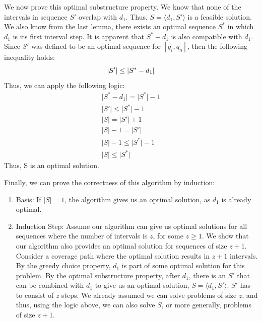 \documentclass[conference]{IEEEtran}
\theoremstyle{plain}%
\begin{document}
We now prove this optimal substructure property. We know that none of the intervals in sequence $S'$ overlap with $d_1$. Thus, $S = \langle d_1, S' \rangle$ is a feasible solution. We also know from the last lemma, there exists an optimal sequence $S^*$ in which $d_1$ is its first interval step. It is apparent that $S^* - d_1$ is also compatible with $d_1$. Since $S'$ was defined to be an optimal sequence for $[q_i, q_n]$, then the following inequality holds:
\begin{equation*}
\lvert S' \rvert \leq \lvert S^* - d_1 \rvert \\
\end{equation*}
Thus, we can apply the following logic:
\begin{gather*}
\lvert S^* - d_1 \rvert = \lvert S^* \rvert -1 \\
\lvert S' \rvert \leq \lvert S^* \rvert -1 \\
\lvert S \rvert = \lvert S' \rvert + 1 \\
\lvert S \rvert -1 = \lvert S' \rvert \\
\lvert S \rvert -1 \leq \lvert S^* \rvert -1 \\
\lvert S \rvert \leq \lvert S^* \rvert 
\end{gather*}
Thus, S is an optimal solution.

Finally, we can prove the correctness of this algorithm by induction:
\begin{enumerate}
\item Basis: If $\lvert S \rvert = 1$, the algorithm gives us an optimal solution, as $d_1$ is already optimal.
\item Induction Step: Assume our algorithm can give us optimal solutions for all sequences where the number of intervals is $z$, for some $z \geq 1$. We show that our algorithm also provides an optimal solution for sequences of size $z+1$. Consider a coverage path where the optimal solution results in $z+1$ intervals. By the greedy choice property, $d_1$ is part of some optimal solution for this problem. By the optimal substructure property, after $d_1$, there is an $S'$ that can be combined with $d_1$ to give us an optimal solution, $S=\langle d_1, S' \rangle$. $S'$ has to consist of $z$ steps. We already assumed we can solve problems of size $z$, and thus, using the logic above, we can also solve $S$, or more generally, problems of size $z+1$.
\end{enumerate}
\end{document}
